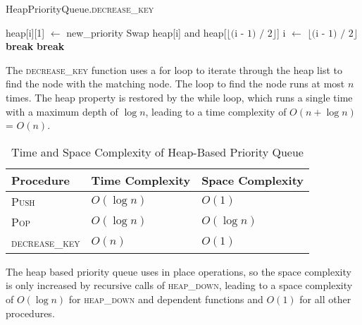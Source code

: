 \documentclass[12pt]{article}
\begin{document}
\begin{algorithm}
    \caption{HeapPriorityQueue.\textsc{decrease\_key}}
    \begin{algorithmic}[1]
         
                \State heap[i][1] $\gets$ new\_priority
                 
                        \State Swap heap[i] and heap[$\lfloor \text{(i - 1) / 2} \rfloor$]
                        \State i $\gets$ $\lfloor \text{(i - 1) / 2} \rfloor$
                    \Else
                        \State \textbf{break}
                    \EndIf
                \EndWhile
                \State \textbf{break}
            \EndIf
        \EndFor
    \end{algorithmic}
\end{algorithm}

The \textsc{decrease\_key} function uses a for loop to iterate through the heap list
to find the node with the matching node. The loop to find the node runs at most $n$
times. The heap property is restored by the while loop, which runs a single time with a
maximum depth of $\log{n}$, leading to a time complexity of $O(n + \log{n})$ = $O(n)$.

\begin{table}[H]
    \centering
    \begin{threeparttable}
        \caption{Time and Space Complexity of Heap-Based Priority Queue}
        \begin{tabular*}{0.8\textwidth}{@{\extracolsep{\fill}}lll@{}}
            \toprule
            \textbf{Procedure} & \textbf{Time Complexity} & \textbf{Space Complexity} \\ \midrule
            \textsc{Push}      & $O(\log n)$ & $O(1)$        \\
            \textsc{Pop}       & $O(\log n)$ & $O(\log n)$   \\
            \textsc{decrease\_key} & $O(n)$  & $O(1)$        \\
            \bottomrule
        \end{tabular*}
    \end{threeparttable}
\end{table}

The heap based priority queue uses in place operations, so the space complexity is only
increased by recursive calls of \textsc{heap\_down}, leading to a space complexity of $O(\log{n})$ for
\textsc{heap\_down} and dependent functions and $O(1)$ for all other procedures.
\end{document}
